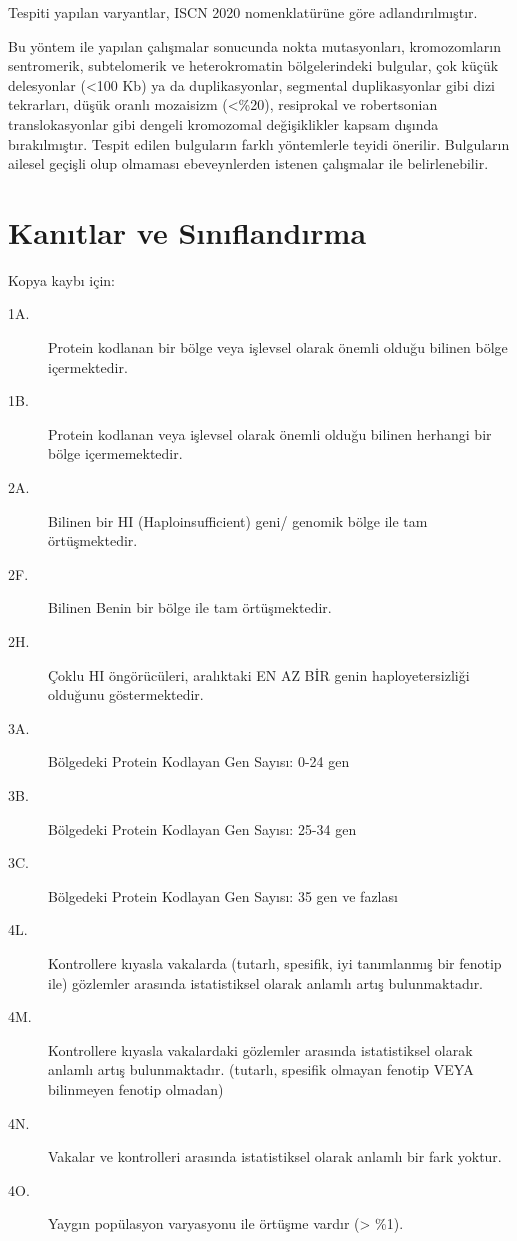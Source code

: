 \documentclass{article}
\begin{document}
Tespiti yapılan varyantlar, ISCN 2020 nomenklatürüne göre adlandırılmıştır.

Bu yöntem ile yapılan çalışmalar sonucunda nokta mutasyonları, kromozomların sentromerik, subtelomerik ve heterokromatin bölgelerindeki bulgular, çok küçük delesyonlar (<100 Kb) ya da duplikasyonlar, segmental duplikasyonlar gibi dizi tekrarları, düşük oranlı mozaisizm (<\%20), resiprokal ve robertsonian translokasyonlar gibi dengeli kromozomal değişiklikler kapsam dışında bırakılmıştır. Tespit edilen bulguların farklı yöntemlerle teyidi önerilir. Bulguların ailesel geçişli olup olmaması ebeveynlerden istenen çalışmalar ile belirlenebilir.

\section{Kanıtlar ve Sınıflandırma}

Kopya kaybı için:
\begin{description}
    \item[1A.] Protein kodlanan bir bölge veya işlevsel olarak önemli olduğu bilinen bölge içermektedir.
    \item[1B.] Protein kodlanan veya işlevsel olarak önemli olduğu bilinen herhangi bir bölge içermemektedir.
    \item[2A.] Bilinen bir HI (Haploinsufficient) geni/ genomik bölge ile tam örtüşmektedir.
    \item[2F.] Bilinen Benin bir bölge ile tam örtüşmektedir.
    \item[2H.] Çoklu HI öngörücüleri, aralıktaki EN AZ BİR genin haployetersizliği olduğunu göstermektedir.
    \item[3A.] Bölgedeki Protein Kodlayan Gen Sayısı: 0-24 gen
    \item[3B.] Bölgedeki Protein Kodlayan Gen Sayısı: 25-34 gen
    \item[3C.] Bölgedeki Protein Kodlayan Gen Sayısı: 35 gen ve fazlası
    \item[4L.] Kontrollere kıyasla vakalarda (tutarlı, spesifik, iyi tanımlanmış bir fenotip ile) gözlemler arasında istatistiksel olarak anlamlı artış bulunmaktadır.
    \item[4M.] Kontrollere kıyasla vakalardaki gözlemler arasında istatistiksel olarak anlamlı artış bulunmaktadır. (tutarlı, spesifik olmayan fenotip VEYA bilinmeyen fenotip olmadan)
    \item[4N.] Vakalar ve kontrolleri arasında istatistiksel olarak anlamlı bir fark yoktur.
    \item[4O.] Yaygın popülasyon varyasyonu ile örtüşme vardır (> \%1).
\end{description}
\end{document}
